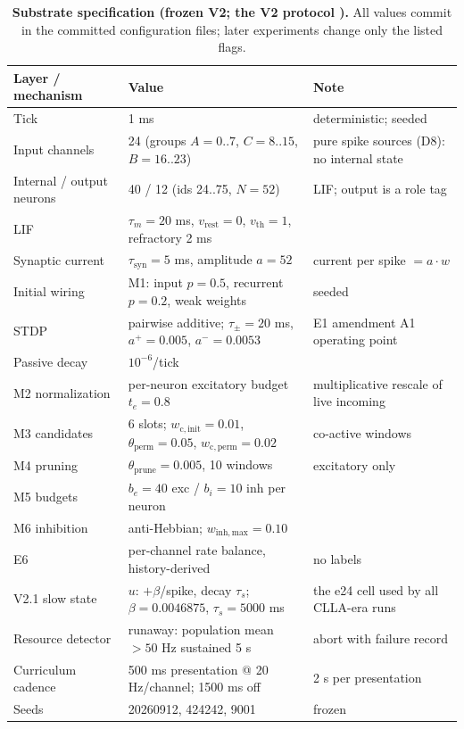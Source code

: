 \begin{table}[t]
\centering
\caption{\textbf{Substrate specification (frozen V2; the V2 protocol
\cite{v2proto}).} All values commit in the committed configuration
files; later experiments change only the listed flags.}
\label{tab:substrate}
\footnotesize
\begin{tabular}{p{3.4cm}p{5.4cm}p{6.4cm}}
\toprule
Layer / mechanism & Value & Note \\
\midrule
Tick & 1 ms & deterministic; seeded \\
Input channels & 24 (groups \(A=0..7\), \(C=8..15\), \(B=16..23\)) & pure spike sources (D8): no internal state \\
Internal / output neurons & 40 / 12 (ids 24..75, \(N=52\)) & LIF; output is a role tag \\
LIF & \(\tau_m = 20\) ms, \(v_{\mathrm{rest}} = 0\), \(v_{\mathrm{th}} = 1\), refractory 2 ms & \\
Synaptic current & \(\tau_{\mathrm{syn}} = 5\) ms, amplitude \(a = 52\) & current per spike \(= a\cdot w\) \\
Initial wiring & M1: input \(p=0.5\), recurrent \(p=0.2\), weak weights & seeded \\
STDP & pairwise additive; \(\tau_\pm = 20\) ms, \(a^+=0.005\), \(a^-=0.0053\) & E1 amendment A1 operating point \\
Passive decay & \(10^{-6}\)/tick & \\
M2 normalization & per-neuron excitatory budget \(t_e = 0.8\) & multiplicative rescale of live incoming \\
M3 candidates & 6 slots; \(w_{\mathrm{c,init}}=0.01\), \(\theta_{\mathrm{perm}}=0.05\), \(w_{\mathrm{c,perm}}=0.02\) & co-active windows \\
M4 pruning & \(\theta_{\mathrm{prune}} = 0.005\), 10 windows & excitatory only \\
M5 budgets & \(b_e = 40\) exc / \(b_i = 10\) inh per neuron & \\
M6 inhibition & anti-Hebbian; \(w_{\mathrm{inh,max}} = 0.10\) & \\
E6 & per-channel rate balance, history-derived & no labels \\
V2.1 slow state & \(u\): \(+\beta\)/spike, decay \(\tau_s\); \(\beta=0.0046875\), \(\tau_s=5000\) ms & the e24 cell used by all CLLA-era runs \\
Resource detector & runaway: population mean \(>50\) Hz sustained 5 s & abort with failure record \\
Curriculum cadence & 500 ms presentation @ 20 Hz/channel; 1500 ms off & 2 s per presentation \\
Seeds & 20260912, 424242, 9001 & frozen \\
\bottomrule
\end{tabular}
\end{table}
